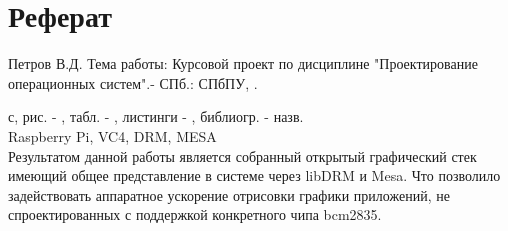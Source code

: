 \section*{\centering Реферат}

Петров В.Д. Тема работы: Курсовой проект по дисциплине "Проектирование операционных
систем".- СПб.: СПбПУ, \the\year. \begin{NoHyper}{\pageref{LastPage}}\end{NoHyper}  с, рис. - \totalfigures{}, табл. - \totaltables{}, листинги - , библиогр. -  назв.\\[1cm]

Raspberry Pi, VC4, DRM, MESA\\

Результатом данной работы является собранный открытый графический стек имеющий общее представление в системе через libDRM и Mesa. Что позволило задействовать аппаратное ускорение отрисовки графики приложений, не спроектированных с поддержкой конкретного чипа bcm2835.

\thispagestyle{empty} %
\newpage

